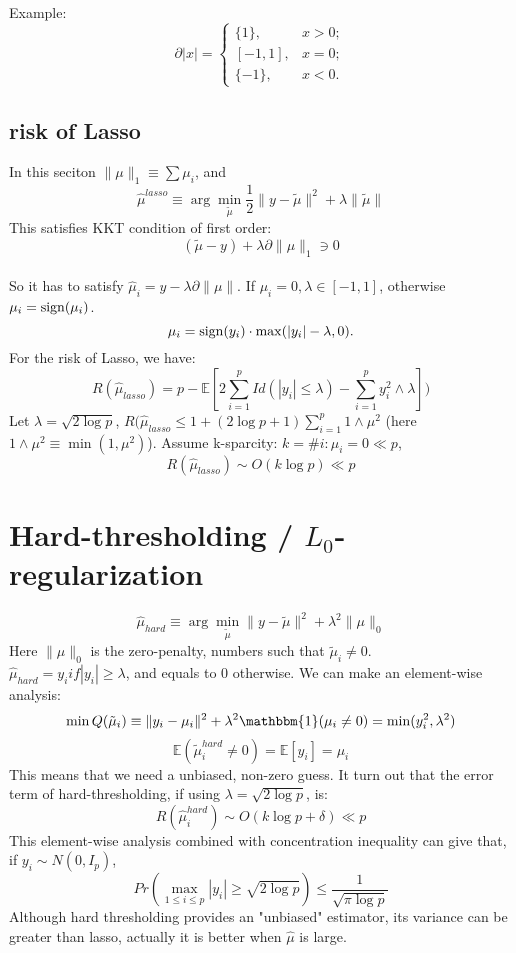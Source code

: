 \documentclass[twoside]{article}
\theoremstyle{definition}
\theoremstyle{definition}
\theoremstyle{remark}
\def\sign{{\rm sign}}
\begin{document}
Example:
$$ \partial|x| = \begin{cases}\{1\},&x>0;\\ [-1,1],& x=0;\\\{-1\},& x<0.\end{cases}$$

\subsection{risk of Lasso}
In this seciton $\| \mu \|_1 \equiv \sum {\mu_i} $, and \begin{equation}
\hat\mu^{lasso} \equiv \arg \min_{\tilde\mu} \frac{1}{2} \| y - \tilde\mu \|^2 + \lambda \| \tilde\mu \|
\end{equation}
This satisfies KKT condition of first order: $$(\tilde\mu - y) + \lambda \partial \| \mu \|_1 \ni 0$$\\
So it has to satisfy $\hat\mu_i = y - \lambda\partial \| \mu \|$. If $\mu_i = 0, \lambda \in [-1,1]$, otherwise $\mu_i
 = \sign(\mu_i)$. \begin{equation} \mu_i = \sign(y_i) \cdot \max(|y_i|-\lambda, 0). \end{equation}
For the risk of Lasso, we have: $$R(\hat\mu_{lasso}) = p - \mathbb{E}[2\sum_{i=1}^p Id(|y_i| \le \lambda) - \sum_{i=1}^p y_i^2 \wedge \lambda])$$ Let $\lambda = \sqrt{2\log p}$, $R(\hat\mu_{lasso} \le 1+(2 \log p + 1) \sum_{i=1}^p 1 \wedge \mu^2$ (here $1 \wedge \mu^2 \equiv \min(1, \mu^2)$). Assume k-sparcity: $k = \# {i: \mu_i = 0} \ll p$, \begin{equation}
R(\hat\mu_{lasso}) \sim O(k\log p) \ll p\end{equation}

\section{Hard-thresholding / $L_0$-regularization}
$$\hat\mu_{hard}  \equiv \arg \min_{\tilde \mu} \| y - \tilde \mu\| ^2 + \lambda ^2 \|\mu\|_0$$
Here $\|\mu\|_0$ is the zero-penalty, numbers such that $\tilde\mu_i \neq 0$.\\
$\hat\mu_{hard} = y_i if |y_i| \ge \lambda$, and equals to $0$ otherwise. We can make an element-wise analysis:
$$\min Q(\tilde\mu_i)\equiv \| y_i-\mu_i\| ^ 2 + \lambda^2 \mathbbm{1}(\mu_i \ne 0) = \min (y_i^2, \lambda^2)$$
$$\mathbb{E}(\tilde\mu_i^{hard} \ne 0) = \mathbb{E}[y_i] = \mu_i$$
This means that we need a unbiased, non-zero guess. It turn out that the error term of hard-thresholding, if using $\lambda = \sqrt{2\log p}$, is: \begin{equation}
R(\hat\mu_i^{hard}) \sim O(k\log p + \delta) \ll p
\end{equation}
This element-wise analysis combined with concentration inequality can give that, if $y_i \sim N(0, I_p)$, 
$$ Pr(\max_{1 \le i \le p} |y_i| \ge \sqrt{2\log p}) \le \frac{1}{\sqrt{\pi\log p} }$$
Although hard thresholding provides an "unbiased" estimator, its variance can be greater than lasso, actually it is better when $\hat\mu$ is large.
\end{document}
